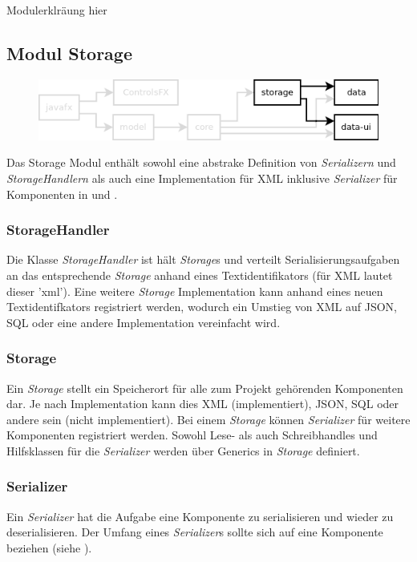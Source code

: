 Modulerklräung hier




\subsection{Modul Storage}
\label{mod_storage}
\begin{figure}[hb!]
	\centering
	\includegraphics[width=.8\textwidth]{module_dependencies_storage.png}
\end{figure}

Das Storage Modul enthält sowohl eine abstrake Definition von \textit{Serializern} und \textit{StorageHandlern}
als auch eine Implementation für XML inklusive \textit{Serializer} für Komponenten in  und
.

\subsubsection{StorageHandler}
Die Klasse \textit{StorageHandler} ist hält \textit{Storage}s und verteilt Serialisierungsaufgaben an
das entsprechende \textit{Storage} anhand eines Textidentifikators (für XML lautet dieser 'xml').
Eine weitere \textit{Storage} Implementation kann anhand eines neuen Textidentifkators registriert werden,
wodurch ein Umstieg von XML auf JSON, SQL oder eine andere Implementation vereinfacht wird.

\subsubsection{Storage}
Ein \textit{Storage} stellt ein Speicherort für alle zum Projekt gehörenden Komponenten dar. Je nach
Implementation kann dies XML (implementiert), JSON, SQL oder andere sein (nicht implementiert). Bei einem
\textit{Storage} können \textit{Serializer} für weitere Komponenten registriert werden. Sowohl Lese- als
auch Schreibhandles und Hilfsklassen für die \textit{Serializer} werden über Generics in \textit{Storage}
definiert.

\subsubsection{Serializer}
Ein \textit{Serializer} hat die Aufgabe eine Komponente zu serialisieren und wieder zu deserialisieren.
Der Umfang eines \textit{Serializer}s sollte sich auf eine Komponente beziehen (siehe ).